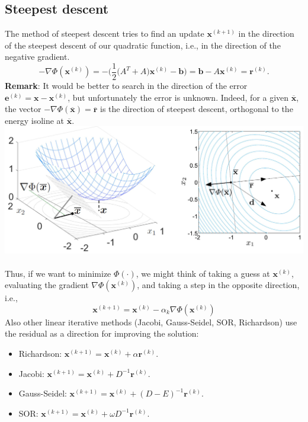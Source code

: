 \documentclass[11pt]{book}
\begin{document}
\subsection*{Steepest descent}
The method of steepest descent tries to find an update $\mathbf{x}^{(k+1)}$ in the direction of the steepest descent of our quadratic function, i.e., in the direction of the negative gradient.
$$-\nabla \Phi\left(\mathbf{x}^{(k)}\right)= - \biggl( \frac{1}{2} \bigl(A^{T} +A \bigl) \mathbf{x}^{(k)} - \mathbf{b} \biggl) =  \mathbf{b}-A \mathbf{x}^{(k)}=\mathbf{r}^{(k)}.$$
\textbf{Remark}: It would be better  to search in the direction of the error $\mathbf{e}^{(k)}=\mathbf{x}-\mathbf{x}^{(k)}$, but unfortunately the error is unknown. Indeed, for a given $\overline{\mathbf{x}}$, the vector $-\nabla 
\Phi(\overline{\mathbf{x}})=\overline{\mathbf{r}}$ is the direction of steepest descent, orthogonal to the energy isoline at $\overline{\mathbf{x}}$.\\
\includegraphics[scale = 0.12,center]{2023_09_05_b72ccc85584d9dc6fb5cg-077} \\ \\
Thus, if we want to minimize $\Phi(\cdot)$, we might think of taking a guess at $\mathbf{x}^{(k)}$, evaluating the gradient $\nabla \Phi\left(\mathbf{x}^{(k)}\right)$, and taking a step in the opposite direction, i.e.,
$$
\mathbf{x}^{(k+1)}=\mathbf{x}^{(k)}-\alpha_{k} \nabla \Phi\left(\mathbf{x}^{(k)}\right)
$$
Also other linear iterative methods (Jacobi, Gauss-Seidel, SOR, Richardson) use the residual as a direction for improving the solution:
\begin{itemize}
  \item Richardson: $\mathbf{x}^{(k+1)}=\mathbf{x}^{(k)}+\alpha \mathbf{r}^{(k)}$.\\
  \item Jacobi: $\mathbf{x}^{(k+1)}=\mathbf{x}^{(k)}+D^{-1} \mathbf{r}^{(k)}$.\\
  \item Gauss-Seidel: $\mathbf{x}^{(k+1)}=\mathbf{x}^{(k)}+(D-E)^{-1} \mathbf{r}^{(k)}$.\\
  \item SOR: $\mathbf{x}^{(k+1)}=\mathbf{x}^{(k)}+\omega D^{-1} \mathbf{r}^{(k)}$.\\
\end{itemize}
\end{document}

